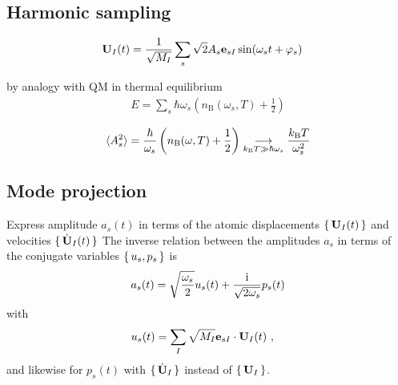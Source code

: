 \subsection{Harmonic sampling}

\begin{align}
{\bf U}_I (t) 
& = \frac{1}{\sqrt{M_I}} \sum_s \sqrt 2 A_s {\bf e}_{sI} \sin (\omega_s t + \varphi_s)
\end{align}

by analogy with QM in thermal equilibrium
\begin{align}
E
=\sum_{s} \hbar \omega_{s}\left(n_{\mathrm{B}}\left(\omega_{s}, T\right)+\frac{1}{2}\right)
\end{align}

\begin{align}
\braket{A_{s}^{2}}
= \frac{\hbar}{\omega_{s}}\left(n_{\mathrm{B}}(\omega, T)+\frac{1}{2}\right)
\underset{k_{\rm B} T \gg \hbar \omega_s}{\longrightarrow} \frac{k_{\rm B} T}{\omega_s^2}
\end{align}

\subsection{Mode projection}

Express amplitude $a_s (t)$ in terms of the atomic displacements $\set{{\bf U}_I (t)}$ and velocities $\set{\dot{{\bf U}}_I (t)}$ 
The inverse relation between the amplitudes $a_s$ in terms of the conjugate variables $\set{u_s, p_s}$ is
\begin{align}
a_s (t) = \sqrt{\frac{\omega_s}{2}} u_s (t) + \frac{{\rm i}}{\sqrt{2 \omega_s}} p_s (t)
\end{align}
with
\begin{subequations}
	\label{eq:mode.projection.u_s}
	\begin{align}
	u_s (t) 
	& = \sum_I \sqrt{M_I} {\bf e}_{sI} \cdot {\bf U}_I (t) ~,
	\end{align}
\end{subequations}
and likewise for $p_s (t)$ with $\set{\dot{{\bf U}}_I}$ instead of $\set{{\bf U}_I}$.
